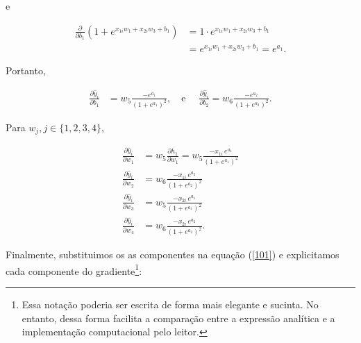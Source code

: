 \documentclass[
  a4paperpaper,
]{article}
\begin{document}
e

\begin{align*}
\frac{\partial}{\partial b_1} \left(1+ e^{x_{1i} w_1 + x_{2i} w_3 + b_1} \right) &= 1 \cdot e^{x_{1i} w_1 + x_{2i} w_3 + b_1} \\
&= e^{x_{1i} w_1 + x_{2i} w_3 + b_1} = e^{a_1}.
\end{align*}

Portanto,

\begin{align*}
  \frac{\partial \hat{y}_i}{\partial b_1} &= w_5 \frac{-e^{a_1}}{\left( 1+e^{a_1} \right)^2 }, \quad \text{e } \quad \frac{\partial \hat{y}_i}{\partial b_2} = w_6 \frac{-e^{a_2}}{\left( 1+e^{a_2} \right)^2 }.
\end{align*}

Para \(w_j, j \in \{ 1, 2, 3, 4 \}\),

\begin{align*}
  \frac{\partial \hat{y}_i}{\partial w_1} &= w_5 \frac{\partial h_1}{\partial w_1} = w_5 \frac{-x_{1i} \, e^{a_1}}{\left(1 + e^{a_1}\right)^2} \\
  \frac{\partial \hat{y}_i}{\partial w_2} &= w_6 \frac{-x_{1i} \, e^{a_2}}{\left(1 + e^{a_2}\right)^2} \\
  \frac{\partial \hat{y}_i}{\partial w_3} &= w_5 \frac{-x_{2i} \, e^{a_1}}{\left(1 + e^{a_1}\right)^2} \\
  \frac{\partial \hat{y}_i}{\partial w_4} &= w_6 \frac{-x_{2i} \, e^{a_2}}{\left(1 + e^{a_2}\right)^2}.
\end{align*}

Finalmente, substituimos os as componentes na equação (\ref{101}) e
explicitamos cada componente do gradiente\footnote{Essa notação poderia
  ser escrita de forma mais elegante e sucinta. No entanto, dessa forma
  facilita a comparação entre a expressão analítica e a implementação
  computacional pelo leitor.}:
\end{document}
